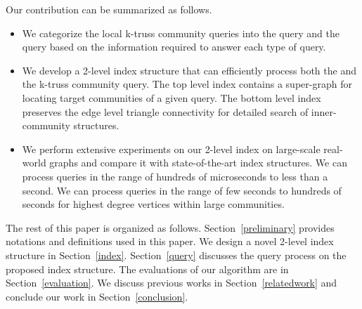 Our contribution can be summarized as follows.
\begin{itemize}
	\item We categorize the local k-truss community queries into the \toplevelprob{} query and the \bottomlevelprob{} query based on the information required to answer each type of query. 
	\item We develop a 2-level index structure that can efficiently process both the \toplevelprob{} and the \bottomlevelprob{} k-truss community query. The top level index contains a super-graph for locating target communities of a given query. The bottom level index preserves the edge level triangle connectivity for detailed search of inner-community structures.  
	\item We perform extensive experiments on our 2-level index on large-scale real-world graphs and compare it with state-of-the-art index structures. We can process \toplevelprob{} queries in the range of hundreds of microseconds to less than a second. We can process \bottomlevelprob{} queries in the range of few seconds to hundreds of seconds for highest degree vertices within large communities. %
\end{itemize}

The rest of this paper is organized as follows. Section~\ref{preliminary} provides notations and definitions used in this paper. We design a novel 2-level index structure in Section~\ref{index}. Section~\ref{query} discusses the query process on the proposed index structure. The evaluations of our algorithm are in Section~\ref{evaluation}.  We discuss previous works in Section~\ref{relatedwork} and conclude our work in Section~\ref{conclusion}.

